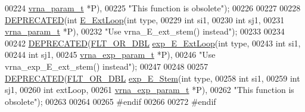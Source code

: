 \begin{DoxyCode}
00224                       \mbox{\hyperlink{group__energy__parameters_structvrna__param__s}{vrna\_param\_t}}  *P),
00225            \textcolor{stringliteral}{"This function is obsolete"});
00226 
00227 
00228 \mbox{\hyperlink{exterior__loops_8h_aab347a3c03fbe8e7319551b9fa0cce4a}{DEPRECATED}}(\textcolor{keywordtype}{int} \mbox{\hyperlink{group__loops_ga05c6288c5a79d3bd5ad6d33c1bb34bd0}{E\_ExtLoop}}(\textcolor{keywordtype}{int}          type,
00229                          \textcolor{keywordtype}{int}          si1,
00230                          \textcolor{keywordtype}{int}          sj1,
00231                          \mbox{\hyperlink{group__energy__parameters_structvrna__param__s}{vrna\_param\_t}} *P),
00232            \textcolor{stringliteral}{"Use vrna\_E\_ext\_stem() instead"});
00233 
00234 
00242 \mbox{\hyperlink{exterior__loops_8h_aab347a3c03fbe8e7319551b9fa0cce4a}{DEPRECATED}}(\mbox{\hyperlink{group__data__structures_ga31125aeace516926bf7f251f759b6126}{FLT\_OR\_DBL}} \mbox{\hyperlink{group__loops_ga446828a191c127861e76e2c84055f672}{exp\_E\_ExtLoop}}(\textcolor{keywordtype}{int}               type,
00243                                     \textcolor{keywordtype}{int}               si1,
00244                                     \textcolor{keywordtype}{int}               sj1,
00245                                     \mbox{\hyperlink{group__energy__parameters_structvrna__exp__param__s}{vrna\_exp\_param\_t}}  *P),
00246            \textcolor{stringliteral}{"Use vrna\_exp\_E\_ext\_stem() instead"});
00247 
00248 
00257 \mbox{\hyperlink{exterior__loops_8h_aab347a3c03fbe8e7319551b9fa0cce4a}{DEPRECATED}}(\mbox{\hyperlink{group__data__structures_ga31125aeace516926bf7f251f759b6126}{FLT\_OR\_DBL}} \mbox{\hyperlink{group__loops_gab0aa9833ab41875a91a9be8a5ffd7092}{exp\_E\_Stem}}(\textcolor{keywordtype}{int}              type,
00258                                  \textcolor{keywordtype}{int}              si1,
00259                                  \textcolor{keywordtype}{int}              sj1,
00260                                  \textcolor{keywordtype}{int}              extLoop,
00261                                  \mbox{\hyperlink{group__energy__parameters_structvrna__exp__param__s}{vrna\_exp\_param\_t}} *P),
00262            \textcolor{stringliteral}{"This function is obsolete"});
00263 
00264 
00265 \textcolor{preprocessor}{#endif}
00266 
00272 \textcolor{preprocessor}{#endif}
\end{DoxyCode}
